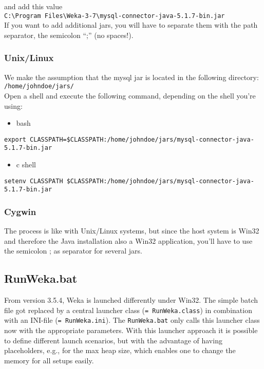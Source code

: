 \noindent and add this value\\

\verb=C:\Program Files\Weka-3-7\mysql-connector-java-5.1.7-bin.jar=\\

\noindent If you want to add additional jars, you will have to separate them with the path separator, the semicolon ``;'' (no spaces!).

\subsubsection*{Unix/Linux}

We make the assumption that the mysql jar is located in the following directory:\\

\verb=/home/johndoe/jars/=\\

\noindent Open a shell and execute the following command, depending on the shell you're using:

\begin{itemize}
\item bash
\end{itemize}

\verb_export CLASSPATH=$CLASSPATH:/home/johndoe/jars/mysql-connector-java-5.1.7-bin.jar_

\begin{itemize}
\item c shell
\end{itemize}

\verb_setenv CLASSPATH $CLASSPATH:/home/johndoe/jars/mysql-connector-java-5.1.7-bin.jar_

\subsubsection*{Cygwin}

The process is like with Unix/Linux systems, but since the host system
is Win32 and therefore the Java installation also a Win32 application,
you'll have to use the semicolon ; as separator for several jars.

\subsection{RunWeka.bat}
\label{RunWeka.ini}

From version 3.5.4, Weka is launched differently under Win32. The
simple batch file got replaced by a central launcher class
(\verb_= RunWeka.class_) in combination with an INI-file
 (\verb_= RunWeka.ini_). The \verb=RunWeka.bat= only calls this
 launcher class now with the appropriate parameters. With this
 launcher approach it is possible to define different launch
 scenarios, but with the advantage of having placeholders, e.g., for
 the max heap size, which enables one to change the memory for all
 setups easily.

